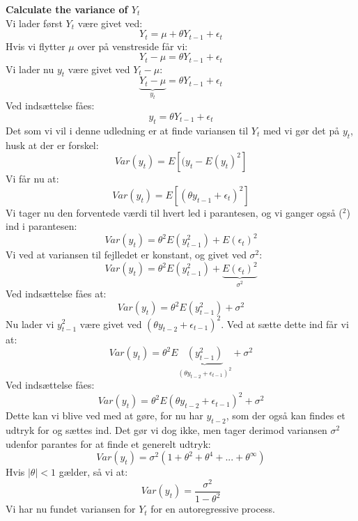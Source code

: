 \documentclass[
  10pt,
]{article}
\begin{document}
\textbf{Calculate the variance of $Y_t$}\\
Vi lader først \(Y_t\) være givet ved:
\[Y_t = \mu + \theta Y_{t-1} + \epsilon_t \] Hvis vi flytter \(\mu\)
over på venstreside får vi:\\
\[Y_t - \mu = \theta Y_{t-1} + \epsilon_t \] Vi lader nu \(y_t\) være
givet ved \(Y_t - \mu\):\\
\[\underbrace{Y_t - \mu}_\text{$y_t$} = \theta Y_{t-1} + \epsilon_t \]
Ved indsættelse fåes:\\
\[y_t = \theta Y_{t-1} + \epsilon_t \] Det som vi vil i denne udledning
er at finde variansen til \(Y_t\) med vi gør det på \(y_t\), husk at der
er forskel:\\
\[Var(y_t) = E[(y_t - E(y_t)^2] \] Vi får nu at:\\
\[Var(y_t) = E[(\theta y_{t-1} + \epsilon_t)^2] \] Vi tager nu den
forventede værdi til hvert led i parantesen, og vi ganger også (\(^2\))
ind i parantesen:\\
\[Var(y_t) = \theta^2 E(y_{t-1}^2) + E(\epsilon_t)^2 \] Vi ved at
variansen til fejlledet er konstant, og givet ved \(\sigma^2\):\\
\[Var(y_t) = \theta^2 E(y_{t-1}^2) + \underbrace{E(\epsilon_t)^2}_\text{$\sigma^2$} \]
Ved indsættelse fåes at:\\
\[Var(y_t) = \theta^2 E(y_{t-1}^2) + \sigma^2 \] Nu lader vi
\(y_{t-1}^2\) være givet ved \((\theta y_{t-2} + \epsilon_{t-1})^2\).
Ved at sætte dette ind får vi at:\\
\[Var(y_t) = \theta^2 E\underbrace{(y_{t-1}^2)}_\text{$(\theta y_{t-2} + \epsilon_{t-1})^2$} + \sigma^2\]
Ved indsættelse fåes:\\
\[Var(y_t) = \theta^2 E(\theta y_{t-2} + \epsilon_{t-1})^2 + \sigma^2\]
Dette kan vi blive ved med at gøre, for nu har \(y_{t-2}\), som der også
kan findes et udtryk for og sættes ind. Det gør vi dog ikke, men tager
derimod variansen \(\sigma^2\) udenfor parantes for at finde et generelt
udtryk:\\
\[Var(y_t) = \sigma^2 (1 + \theta^2 + \theta^4 + ... + \theta^\infty)\]
Hvis \(|\theta|<1\) gælder, så vi at:\\
\[Var(y_t) = \frac{\sigma^2}{1-\theta^2} \] Vi har nu fundet variansen
for \(Y_t\) for en autoregressive process.\\
\end{document}

